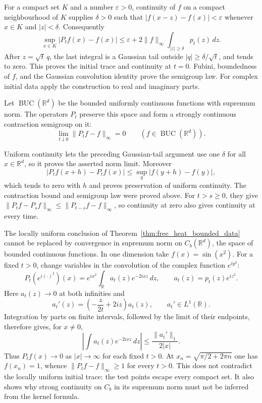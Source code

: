For a compact set $K$ and a number $\varepsilon>0$, continuity of
$f$ on a compact neighbourhood of $K$ supplies $\delta>0$ such that
$|f(x-z)-f(x)|<\varepsilon$ whenever $x\in K$ and $|z|<\delta$.
Consequently
\[
\sup_{x\in K}|P_tf(x)-f(x)|
\leq\varepsilon+2\|f\|_\infty
                 \int_{|z|\geq\delta}p_t(z)\,dz.
\]
After $z=\sqrt t\,q$, the last integral is a Gaussian tail outside
$|q|\geq\delta/\sqrt t$, and tends to zero. This proves the initial
trace and continuity at $t=0$. Fubini, boundedness of $f$, and the
Gaussian convolution identity prove the semigroup law. For complex
initial data apply the construction to real and imaginary parts.
\Done

\begin{corollary}
\label{cor:heat_uniform_initial_trace}
Let $\operatorname{BUC}(\mathbb R^d)$ be the bounded uniformly
continuous functions with supremum norm. The operators $P_t$ preserve
this space and form a strongly continuous contraction semigroup on it:
\[
\lim_{t\downarrow0}\|P_tf-f\|_\infty=0
\qquad(f\in\operatorname{BUC}(\mathbb R^d)).
\]
\end{corollary}
\Proof
Uniform continuity lets the preceding Gaussian-tail argument use one
$\delta$ for all $x\in\mathbb R^d$, so it proves the asserted norm
limit. Moreover
\[
|P_tf(x+h)-P_tf(x)|
\leq\sup_y|f(y+h)-f(y)|,
\]
which tends to zero with $h$ and proves preservation of uniform
continuity. The contraction bound and semigroup law were proved above.
For $t>s\geq0$, they give
$\|P_tf-P_sf\|_\infty\leq\|P_{t-s}f-f\|_\infty$,
so continuity at zero also gives continuity at every time.
\Done

\begin{example}
The locally uniform conclusion of Theorem~\ref{thm:free_heat_bounded_data}
cannot be replaced by convergence in supremum norm on $C_b(\mathbb R^d)$,
the space of bounded continuous functions.
In one dimension take $f(x)=\sin(x^2)$. For a fixed $t>0$, change
variables in the convolution of the complex function $e^{iy^2}$:
\[
P_t(e^{i(\cdot)^2})(x)
=e^{ix^2}\int_{\mathbb R}a_t(z)e^{-2ixz}\,dz,
\qquad a_t(z)=p_t(z)e^{iz^2}.
\]
Here $a_t(z)\to0$ at both infinities and
\[
a_t'(z)=\left(-\frac{z}{2t}+2iz\right)a_t(z),
\qquad a_t'\in L^1(\mathbb R).
\]
Integration by parts on finite intervals, followed by the limit of
their endpoints, therefore gives, for $x\ne0$,
\[
\left|\int a_t(z)e^{-2ixz}\,dz\right|
\leq\frac{\|a_t'\|_1}{2|x|}.
\]
Thus $P_tf(x)\to0$ as $|x|\to\infty$ for each fixed $t>0$.
At $x_n=\sqrt{\pi/2+2\pi n}$ one has $f(x_n)=1$, whence
$\|P_tf-f\|_\infty\geq1$ for every $t>0$. This does not contradict
the locally uniform initial trace: the test points escape every
compact set. It also shows why strong continuity on $C_b$ in its
supremum norm must not be inferred from the kernel formula.
\end{example}

